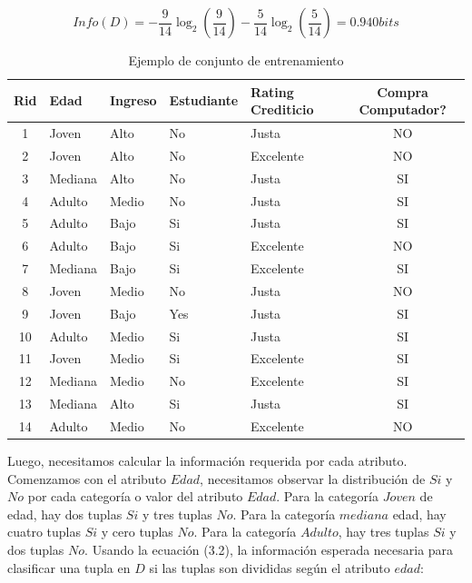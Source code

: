 \begin{equation*}
Info(D) = - \frac{9}{14}\log_2(\frac{9}{14}) - \frac{5}{14}\log_2(\frac{5}{14})	= 0.940 bits
\end{equation*}

\begin{table}[htbp]
	\caption{Ejemplo de conjunto de entrenamiento}
	\label{tabla:sencilla2}
	\begin{tabular}{|c|l|l|l|l|c|}
		\hline 
		\textbf{Rid} & \textbf{Edad}    & \textbf{Ingreso} & \textbf{Estudiante} & \textbf{Rating Crediticio} & \textbf{Compra Computador?} \\
		\hline 
		\hline
		1   & Joven   & Alto    & No         & Justa             & NO                 \\ 
		2   & Joven   & Alto    & No         & Excelente         & NO                 \\ 
		3   & Mediana & Alto    & No         & Justa             & SI                 \\ 
		4   & Adulto  & Medio   & No         & Justa             & SI                 \\ 
		5   & Adulto  & Bajo    & Si         & Justa             & SI                 \\ 
		6   & Adulto  & Bajo    & Si         & Excelente         & NO                 \\ 
		7   & Mediana & Bajo    & Si         & Excelente         & SI                 \\ 
		8   & Joven   & Medio   & No         & Justa             & NO                 \\ 
		9   & Joven   & Bajo    & Yes        & Justa             & SI                 \\ 
		10  & Adulto  & Medio   & Si         & Justa             & SI                 \\
		11  & Joven   & Medio   & Si         & Excelente         & SI                 \\
		12  & Mediana & Medio   & No         & Excelente         & SI                 \\
		13  & Mediana & Alto    & Si         & Justa             & SI                 \\
		14  & Adulto  & Medio   & No         & Excelente         & NO                 \\
		\hline
		\hline
	\end{tabular}
\end{table}

Luego, necesitamos calcular la información requerida por cada atributo. Comenzamos con el atributo $Edad$, necesitamos observar la distribución de $Si$ y $No$ por cada categoría o valor del atributo $Edad$. Para la categoría $Joven$ de edad, hay dos tuplas $Si$ y tres tuplas $No$. Para la categoría $mediana$ edad, hay cuatro tuplas $Si$ y cero tuplas $No$. Para la categoría $Adulto$, hay tres tuplas $Si$ y dos tuplas $No$. Usando la ecuación (3.2), la información esperada necesaria para clasificar una tupla en $D$ si las tuplas son divididas según el atributo $edad$:

